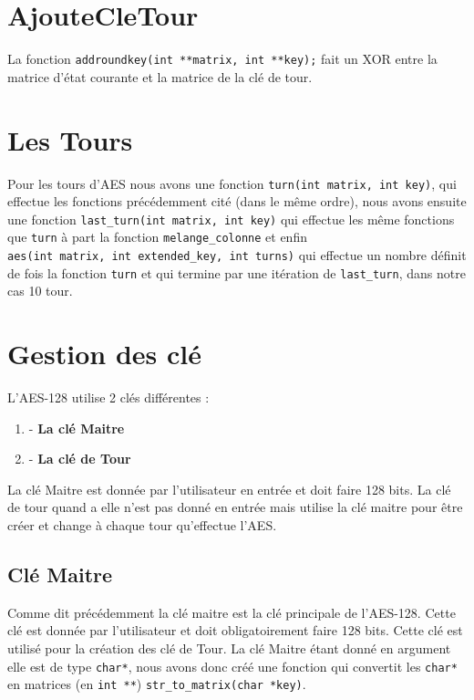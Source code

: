 \documentclass[french, 12pt]{article}
\begin{document}
	\section{AjouteCleTour}
	
	La fonction \verb|addroundkey(int **matrix, int **key);| fait un XOR entre la matrice d'état courante et la matrice de la clé de tour.
	
	\section{Les Tours}
	
	Pour les tours d'AES nous avons une fonction \verb|turn(int matrix, int key)|, qui effectue les fonctions précédemment cité (dans le même ordre), nous avons ensuite une fonction  \verb|last_turn(int matrix, int key)| qui effectue les même fonctions que \verb|turn| à part la fonction \verb|melange_colonne| et enfin \\ \verb|aes(int matrix, int extended_key, int turns)| qui effectue un nombre définit de fois la fonction \verb|turn| et qui termine par une itération de \verb|last_turn|, dans notre cas 10 tour.
	
	\section{Gestion des clé}
	
	L'AES-128 utilise 2 clés différentes : 
	\begin{enumerate}
		\item - \textbf{La clé Maitre}
		\item - \textbf{La clé de Tour}
	\end{enumerate}
	La clé Maitre est donnée par l'utilisateur en entrée et doit faire 128 bits. La clé de tour quand a elle n'est pas donné en entrée mais utilise la clé maitre pour être créer et change à chaque tour qu'effectue l'AES.
	
	\subsection{Clé Maitre}
	Comme dit précédemment la clé maitre est la clé principale de l'AES-128. Cette clé est donnée par l'utilisateur et doit obligatoirement faire 128 bits. Cette clé est utilisé pour la création des clé de Tour. La clé Maitre étant donné en argument elle est de type \verb|char*|, nous avons donc créé une fonction qui convertit les \verb|char*| en matrices (en \verb|int **|) \verb|str_to_matrix(char *key)|. 
	
\end{document}
